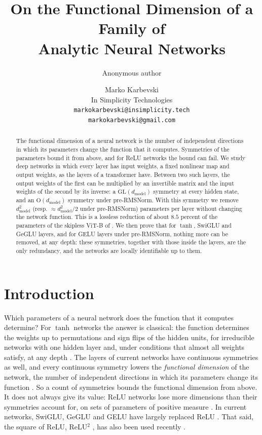 \documentclass[10pt]{article}
\title{\Large\bfseries On the Functional Dimension of a Family of\\ Analytic Neural Networks}
\author{Anonymous author}
\author{Marko Karbevski\\
In Simplicity Technologies\\
{\small\texttt{markokarbevski@insimplicity.tech}}\\
{\small\texttt{markokarbevski@gmail.com}}}
\date{}
\theoremstyle{definition}
\theoremstyle{remark}
\newcommand{\dm}{d_{\mathrm{model}}}
\newcommand{\GL}{\mathrm{GL}}
\newcommand{\Ort}{\mathrm{O}}
\begin{document}
\maketitle
\vspace{-1.5em}

\begin{abstract}
The functional dimension of a neural network is the number of independent directions in which its parameters change the function that it computes. Symmetries of the parameters bound it from above, and for ReLU networks the bound can fail. We study deep networks in which every layer has input weights, a fixed nonlinear map and output weights, as the layers of a transformer have. Between two such layers, the output weights of the first can be multiplied by an invertible matrix and the input weights of the second by its inverse: a $\GL(\dm)$ symmetry at every hidden state, and an $\Ort(\dm)$ symmetry under pre-RMSNorm. With this symmetry we remove $\dm^2$ (resp. $\approx \dm^2/2$ under pre-RMSNorm) parameters per layer without changing the network function. This is a lossless reduction of about $8.5$ percent of the parameters of the skipless ViT-B of \citet{ji2026cutting}. We then prove that for $\tanh$, SwiGLU and GeGLU layers, and for GELU layers under pre-RMSNorm, nothing more can be removed, at any depth: these symmetries, together with those inside the layers, are the only redundancy, and the networks are locally identifiable up to them.
\end{abstract}

\section{Introduction}\label{sec:intro}

Which parameters of a neural network does the function that it computes determine? For $\tanh$ networks the answer is classical: the function determines the weights up to permutations and sign flips of the hidden units, for irreducible networks with one hidden layer \citep{sussmann1992} and, under conditions that almost all weights satisfy, at any depth \citep{fefferman1994}. The layers of current networks have continuous symmetries as well, and every continuous symmetry lowers the \emph{functional dimension} of the network, the number of independent directions in which its parameters change its function \citep{grigsby2022functional}. So a count of symmetries bounds the functional dimension from above. It does not always give its value: ReLU networks lose more dimensions than their symmetries account for, on sets of parameters of positive measure \citep{grigsby2023hidden}. In current networks, SwiGLU, GeGLU and GELU have largely replaced ReLU \citep{liu2022convnet,touvron2023llama,jiang2023mistral,gemma2024,karpathy2023nanogpt}. That said, the square of ReLU, ReLU$^2$ \citep{so2021primer}, has also been used recently \citep{jordan2024modded,nvidia2025nemotron3}.
\end{document}
